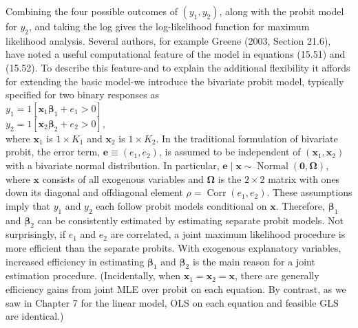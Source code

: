 \documentclass[10pt]{article}
\begin{document}
Combining the four possible outcomes of $\left(y_{1}, y_{2}\right)$, along with the probit model for $y_{2}$, and taking the log gives the log-likelihood function for maximum likelihood analysis. Several authors, for example Greene (2003, Section 21.6), have noted a useful computational feature of the model in equations (15.51) and (15.52). To describe this feature-and to explain the additional flexibility it affords for extending the basic model-we introduce the bivariate probit model, typically specified for two binary responses as\\
$y_{1}=1\left[\mathbf{x}_{1} \boldsymbol{\beta}_{1}+e_{1}>0\right]$\\
$y_{2}=1\left[\mathbf{x}_{2} \boldsymbol{\beta}_{2}+e_{2}>0\right]$,\\
where $\mathbf{x}_{1}$ is $1 \times K_{1}$ and $\mathbf{x}_{2}$ is $1 \times K_{2}$. In the traditional formulation of bivariate probit, the error term, $\mathbf{e} \equiv\left(e_{1}, e_{2}\right)$, is assumed to be independent of $\left(\mathbf{x}_{1}, \mathbf{x}_{2}\right)$ with a bivariate normal distribution. In particular, $\mathbf{e} \mid \mathbf{x} \sim \operatorname{Normal}(\mathbf{0}, \boldsymbol{\Omega})$, where $\mathbf{x}$ consists of all exogenous variables and $\boldsymbol{\Omega}$ is the $2 \times 2$ matrix with ones down its diagonal and offdiagonal element $\rho=\operatorname{Corr}\left(e_{1}, e_{2}\right)$. These assumptions imply that $y_{1}$ and $y_{2}$ each follow probit models conditional on $\mathbf{x}$. Therefore, $\boldsymbol{\beta}_{1}$ and $\boldsymbol{\beta}_{2}$ can be consistently estimated by estimating separate probit models. Not surprisingly, if $e_{1}$ and $e_{2}$ are correlated, a joint maximum likelihood procedure is more efficient than the separate probits. With exogenous explanatory variables, increased efficiency in estimating $\boldsymbol{\beta}_{1}$ and $\boldsymbol{\beta}_{2}$ is the main reason for a joint estimation procedure. (Incidentally, when $\mathbf{x}_{1}= \mathbf{x}_{2}=\mathbf{x}$, there are generally efficiency gains from joint MLE over probit on each equation. By contrast, as we saw in Chapter 7 for the linear model, OLS on each equation and feasible GLS are identical.)
\end{document}
